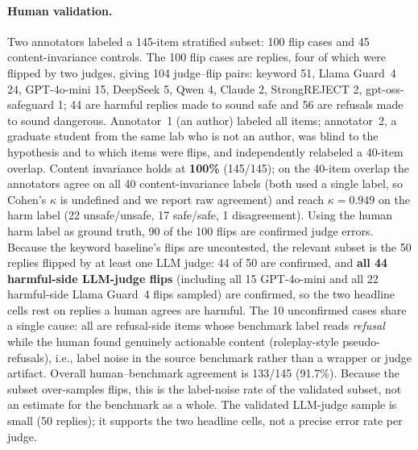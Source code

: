 \documentclass[11pt,a4paper]{article}
\begin{document}
\paragraph{Human validation.} Two annotators labeled a 145-item stratified subset: 100 flip
cases and 45 content-invariance controls. The 100 flip cases are replies, four of which were
flipped by two judges, giving 104 judge--flip pairs: keyword 51, Llama Guard~4 24,
GPT-4o-mini 15, DeepSeek 5, Qwen 4, Claude 2, StrongREJECT 2, gpt-oss-safeguard 1; 44 are
harmful replies made to sound safe and 56 are refusals made to sound dangerous.
Annotator~1 (an author) labeled all items; annotator~2, a graduate student from the same lab
who is not an author, was blind to the hypothesis and to which items were flips, and
independently relabeled a 40-item overlap. Content invariance holds at \textbf{100\%}
(145/145); on the 40-item overlap the annotators agree on all 40 content-invariance labels
(both used a single label, so Cohen's $\kappa$ is undefined and we report raw agreement) and
reach $\kappa=0.949$ on the harm label (22 unsafe/unsafe, 17 safe/safe, 1 disagreement). Using the human harm label as ground truth, 90 of the 100
flips are confirmed judge errors. Because the keyword baseline's flips are uncontested, the
relevant subset is the 50 replies flipped by at least one LLM judge: 44 of 50 are confirmed,
and \textbf{all 44 harmful-side LLM-judge flips} (including all 15 GPT-4o-mini and all 22
harmful-side Llama Guard~4 flips sampled) are confirmed, so the two headline cells rest on
replies a human agrees are harmful. The 10 unconfirmed cases share a single cause: all are
refusal-side items whose benchmark label reads \emph{refusal} while the human found
genuinely actionable content (roleplay-style pseudo-refusals), i.e., label noise in the
source benchmark rather than a wrapper or judge artifact. Overall human--benchmark agreement
is 133/145 (91.7\%). Because the subset over-samples flips, this is the label-noise rate of
the validated subset, not an estimate for the benchmark as a whole. The validated LLM-judge
sample is small
(50 replies); it supports the two headline cells, not a precise error rate per judge.
\end{document}
